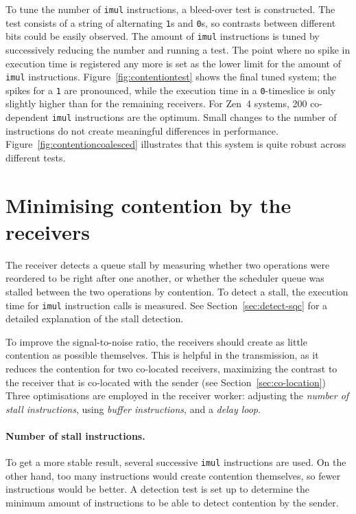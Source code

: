 \documentclass[11pt,
  titlepage=false,
  parskip=half,      %
]{scrreprt}
\begin{document}
To tune the number of \texttt{imul} instructions, a bleed-over test is constructed.
The test consists of a string of alternating \texttt{1}s and \texttt{0}s, so contrasts between different bits could be easily observed.
The amount of \texttt{imul} instructions is tuned by successively reducing the number and running a test.
The point where no spike in execution time is registered any more is set as the lower limit for the amount of \texttt{imul} instructions.
Figure~\ref{fig:contentiontest} shows the final tuned system;
the spikes for a \texttt{1} are pronounced, while the execution time in a \texttt{0}-timeslice is only slightly higher than for the remaining receivers.
For Zen~4 systems, 200 co-dependent \texttt{imul} instructions are the optimum.
Small changes to the number of instructions do not create meaningful differences in performance.
Figure~\ref{fig:contentioncoalesced} illustrates that this system is quite robust across different tests.

\section{Minimising contention by the receivers}
\label{sec:reducecontention}
The receiver detects a queue stall by measuring whether two operations were reordered to be right after one another,
or whether the scheduler queue was stalled between the two operations by contention.
To detect a stall, the execution time for \texttt{imul} instruction calls is measured.
See Section~\ref{sec:detect-sqc} for a detailed explanation of the stall detection.

To improve the signal-to-noise ratio, the receivers should create as little contention as possible themselves.
This is helpful in the transmission, as it reduces the contention for two co-located receivers,
maximizing the contrast to the receiver that is co-located with the sender (see Section~\ref{sec:co-location})
Three optimisations are employed in the receiver worker: adjusting the \textit{number of stall instructions},
using \textit{buffer instructions}, and a \textit{delay loop}.

\paragraph{Number of stall instructions.}
To get a more stable result, several successive \texttt{imul} instructions are used.
On the other hand, too many instructions would create contention themselves, so fewer instructions would be better.
A detection test is set up to determine the minimum amount of instructions to be able to detect contention by the sender.
\end{document}
